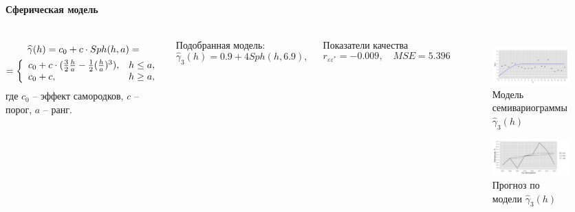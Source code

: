 \documentclass[10pt,pdf,aspectratio=169,hyperref={unicode},notheorems]{beamer}
\theoremstyle{definition}
\theoremstyle{example}
\theoremstyle{plain}
\begin{document}
\begin{frame}
  \frametitle{\large\subsecname}
  \framesubtitle{Сферическая модель}
  \begin{columns}[c]
  \column{3in}
  \begin{equation}\begin{gathered}
  \label{eq:sph}
    \widehat{\gamma}(h) = c_0 + c \cdot Sph(h, a) = \\
    = \left\{
    \begin{array}{l l}
      c_0 + c \cdot (\frac{3}{2} \frac{h}{a} - \frac{1}{2}(\frac{h}{a})^3), & h \le a, \\
      c_0 + c, & h \geq a,
    \end{array} \right.
  \end{gathered}\end{equation}
  где $ c_0 $ -- эффект самородков, $ c $ -- порог, $ a $ -- ранг.

  \vspace{0.5em}

  Подобранная модель:
  \begin{equation}
  \label{eq:gamma5}
    \widehat{\gamma}_3(h) = 0.9 + 4 Sph(h, 6.9),
  \end{equation}

  Показатели качества
  \begin{equation*}
    r_{\varepsilon\varepsilon^{*}} = -0.009, \quad MSE = 5.396
  \end{equation*}

  \column{3in}
  \vspace{-14.5pt}
  \begin{figure}[H]
    \includegraphics[width=0.9\linewidth]{../../figures/variogram/sph-fit-adapt-modeled.png} \\
    \caption{Модель семивариограммы $\widehat{\gamma}_3(h)$}
    \includegraphics[width=0.9\linewidth]{../../figures/variogram/sph-fit-adapt-cross-prediction.png}
    \caption{Прогноз по модели $\widehat{\gamma}_3(h)$}
  \end{figure}
  \end{columns}
\end{frame}
\end{document}
